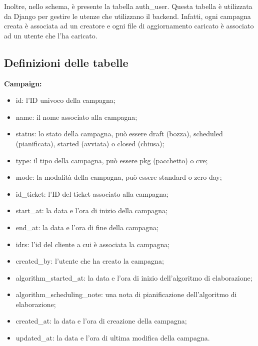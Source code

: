 Inoltre, nello schema, è presente la tabella auth\_user. 
Questa tabella è utilizzata da Django per gestire le utenze che 
utilizzano il backend. Infatti, ogni campagna creata è associata ad 
un creatore e ogni file di aggiornamento caricato è associato ad un 
utente che l’ha caricato.

\subsection{Definizioni delle tabelle}

\textbf{Campaign:}
\begin{itemize}
\item id: l'ID univoco della campagna;
\item name: il nome associato alla campagna;
\item status: lo stato della campagna, può essere draft (bozza), scheduled (pianificata), started (avviata) o closed (chiusa);
\item type: il tipo della campagna, può essere pkg (pacchetto) o cve;
\item mode: la modalità della campagna, può essere standard o zero day;
\item id\_ticket: l'ID del ticket associato alla campagna;
\item start\_at: la data e l'ora di inizio della campagna;
\item end\_at: la data e l'ora di fine della campagna;
\item idrs: l’id del cliente a cui è associata la campagna;
\item created\_by: l'utente che ha creato la campagna;
\item algorithm\_started\_at: la data e l'ora di inizio dell'algoritmo di elaborazione;
\item algorithm\_scheduling\_note: una nota di pianificazione dell'algoritmo di elaborazione;
\item created\_at: la data e l'ora di creazione della campagna;
\item updated\_at: la data e l'ora di ultima modifica della campagna.
\end{itemize}

